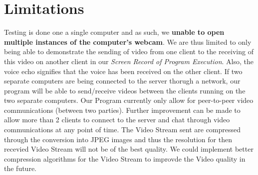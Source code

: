 \documentclass[a4paper,11pt]{article}
\begin{document}
\section{Limitations}
Testing is done one a single computer and as such, we \textbf{unable to open multiple instances of the computer's webcam}. We are thus limited to only being able to demonstrate the sending of video from one client to the receiving of this video on another client in our \textit{Screen Record of Program Execution}.  Also, the voice echo signifies that the voice has been received on the other client. If two separate computers are being connected to the server thorugh a network, our program will be able to send/receive videos between the clients running on the two separate computers. \newline 
Our Program currently only allow for peer-to-peer video communications (between two parties).  Further improvement can be made to allow more than 2 clients to connect to the server and chat through video communications at any point of time. The Video Stream sent are compressed through the conversion into JPEG images and thus the resolution for then recevied Video Stream will not be of the best quality. We could implement better compression algorithms for the Video Stream to improvde the Video quality in the future.
\end{document}
